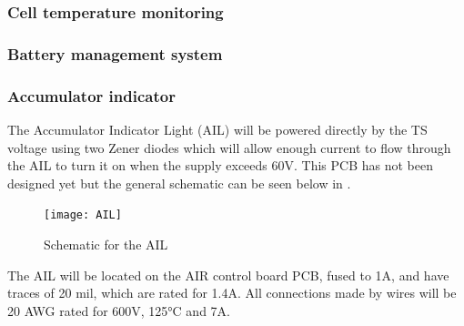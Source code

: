 \documentclass{article}
\begin{document}
\subsubsection{Cell temperature monitoring}\label{accumulator_cell_temperature_monitoring}

\subsubsection{Battery management system}\label{accumulator_battery_management_system}


\subsubsection{Accumulator indicator}\label{accumulator_indicator}
The Accumulator Indicator Light (AIL) will be powered directly by the TS voltage using two Zener diodes which will allow enough current to flow through the AIL to turn it on when the supply exceeds 60V. This PCB has not been designed yet but the general schematic can be seen below in . \\

\begin{figure}[h]
\centering
\texttt{[image: AIL]}
\caption{Schematic for the AIL}
\label{fig:AILcircuit}
\end{figure}

The AIL will be located on the AIR control board PCB, fused to 1A, and have traces of 20 mil, which are rated for 1.4A. All connections made by wires will be 20 AWG rated for 600V, 125°C and 7A.
\end{document}
